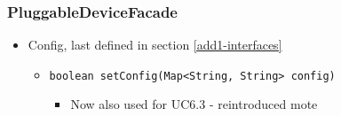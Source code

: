     \subsubsection{PluggableDeviceFacade}
        \begin{itemize}
        	\item Config, last defined in section \ref{add1-interfaces}
        	\begin{itemize}
                \item \texttt{boolean setConfig(Map<String, String> config)}
                    \begin{itemize}
                        \item Now also used for UC6.3 - reintroduced mote
                    \end{itemize}
        	\end{itemize}


\end{itemize}
